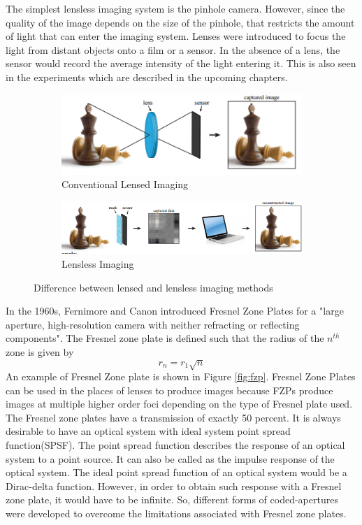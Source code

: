 The simplest lensless imaging system is the pinhole camera. However, since the quality of the image depends on the size of the pinhole, that restricts the amount of light that can enter the imaging system. Lenses were introduced to focus the light from distant objects onto a film or a sensor. In the absence of a lens, the sensor would record the average intensity of the light entering it. This is also seen in the experiments which are described in the upcoming chapters. 
\begin{figure}[ht]
\centering
\begin{subfigure}{\textwidth}
  \centering
  \includegraphics[width=0.75\linewidth]{pics/lensless_1}
  \caption{Conventional Lensed Imaging}
  \label{fig:lensed_imaging}
\end{subfigure}
\begin{subfigure}{\textwidth}
  \centering
  \includegraphics[width=0.75\linewidth]{pics/lensless_2}
  \caption{Lensless Imaging}
  \label{fig:lensless_imaging}
\end{subfigure}
\caption{Difference between lensed and lensless imaging methods\cite{VBoomi}}
\label{fig:lensvslensless}
\end{figure}

In the 1960s, Fernimore and Canon introduced Fresnel Zone Plates for a "large aperture, high-resolution camera with neither refracting or reflecting components"\cite{Cannon1}. The Fresnel zone plate is defined such that the radius of the $n^{th}$ zone is given by 
\begin{equation}
r_n  = r_1 \sqrt{n}
\end{equation}
An example of Fresnel Zone plate is shown in Figure \ref{fig:fzp}. Fresnel Zone Plates can be used in the places of lenses to produce images because FZPs produce images at multiple higher order foci depending on the type of Fresnel plate used. The Fresnel zone plates have a transmission of exactly 50 percent. It is always desirable to have an optical system with ideal system point spread function(SPSF). The point spread function describes the response of an optical system to a point source. It can also be called as the impulse response of the optical system. The ideal point spread function of an optical system would be a Dirac-delta function. However, in order to obtain such response with a Fresnel zone plate, it would have to be infinite. So, different forms of coded-apertures were developed to overcome the limitations associated with Fresnel zone plates. 

